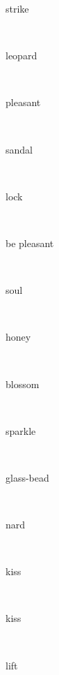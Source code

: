 \documentclass[a4paper]{article}
\begin{document}
\begin{multicols}{4}
\begin{multicols}{4}
\begin{multicols}{5}
{\hebrewfont{}} \begin{english}strike\end{english}\\
{\hebrewfont{}} \begin{english}leopard\end{english}\\
{\hebrewfont{}} \begin{english}pleasant\end{english}\\
{\hebrewfont{}} \begin{english}sandal\end{english}\\
{\hebrewfont{}} \begin{english}lock\end{english}\\
{\hebrewfont{}} \begin{english}be pleasant\end{english}\\
{\hebrewfont{}} \begin{english}soul\end{english}\\
{\hebrewfont{}} \begin{english}honey\end{english}\\
{\hebrewfont{}} \begin{english}blossom\end{english}\\
{\hebrewfont{}} \begin{english}sparkle\end{english}\\
{\hebrewfont{}} \begin{english}glass-bead\end{english}\\
{\hebrewfont{}} \begin{english}nard\end{english}\\
{\hebrewfont{}} \begin{english}kiss\end{english}\\
{\hebrewfont{}} \begin{english}kiss\end{english}\\
{\hebrewfont{}} \begin{english}lift\end{english}\\

\end{multicols}
\end{multicols}
\end{multicols}
\end{document}
